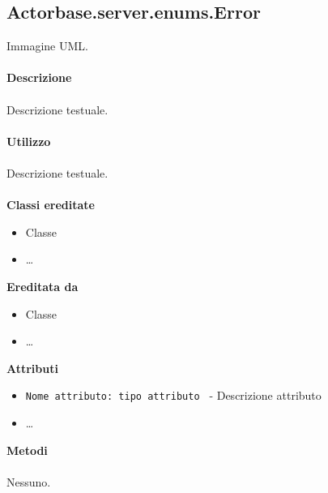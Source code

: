 \documentclass[a4paper]{article}
\begin{document}
	\subsection{Actorbase.server.enums.Error}
		Immagine UML.
		\\ \\
		\textbf{Descrizione}
			\\ \\
			Descrizione testuale.
			\\ \\
		\textbf{Utilizzo}
			\\ \\
			Descrizione testuale.
			\\ \\
		\textbf{Classi ereditate}
			\begin{itemize}
				\item Classe
				\item \dots
			\end{itemize}
		\textbf{Ereditata da}
			\begin{itemize}
				\item Classe
				\item \dots
			\end{itemize}
		\textbf{Attributi}
			\begin{itemize}
				\item \texttt{Nome attributo: tipo attributo } - Descrizione attributo
				\item \dots
			\end{itemize}
		\textbf{Metodi}
			\\ \\
			Nessuno.
			
\end{document}
